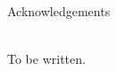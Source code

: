 \begin{Huge}
Acknowledgements
\end{Huge}\\[1cm]
\noindent
To be written.
\newpage
\null
\thispagestyle{empty}
\newpage
